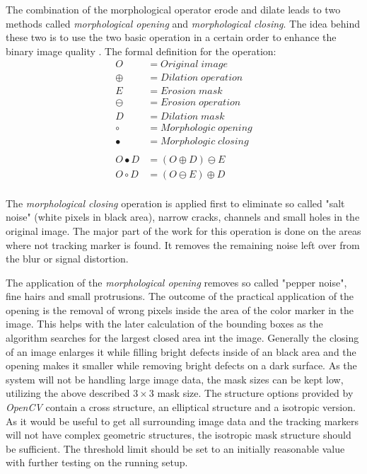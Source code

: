 The combination of the morphological operator erode and dilate leads to two methods called \textit{morphological opening} and \textit{morphological closing}. The idea behind these two is to use the two basic operation in a certain order to enhance the binary image quality \cite[chapter~3.12]{Davies.2017}.
The formal definition for the operation:
\begin{equation}
 \begin{split}
O&=Original\; image \\
\oplus&= Dilation\; operation\\
E&=Erosion\; mask\\
\ominus&= Erosion\; operation\\
D&=Dilation\; mask\\
\circ&= Morphologic\; opening\\
\bullet&= Morphologic\; closing\\
\\
O\bullet D&=(O\oplus D)\ominus E\\
O\circ D&=(O \ominus E)\oplus D\\
\end{split}
\end{equation}

The \textit{morphological closing} operation is applied first to eliminate so called "salt noise" (white pixels in black area), narrow cracks, channels and 	small holes in the original image. The major part of the work for this operation is done on the areas where not tracking marker is found. It removes the remaining noise left over from the blur or signal distortion.

The application of the \textit{morphological opening} removes so called "pepper noise", fine hairs and small protrusions. 
The outcome of the practical application of the opening is the removal of wrong pixels inside the area of the color marker in the image. This helps with the later calculation of the bounding boxes as the algorithm searches for the largest closed area int the image.
Generally the closing of an image enlarges it while filling bright defects inside of an black area and the opening makes it smaller while removing bright defects on a dark surface.
As the system will not be handling large image data, the mask sizes can be kept low, utilizing the above described $3\times 3$ mask size. The structure options provided by \textit{OpenCV} contain a cross structure, an elliptical structure and a isotropic version. As it would be useful to get all surrounding image data and the tracking markers will not have complex geometric structures, the isotropic mask structure should be sufficient. The threshold limit  should be set to an  initially reasonable value with further testing on the running setup.
